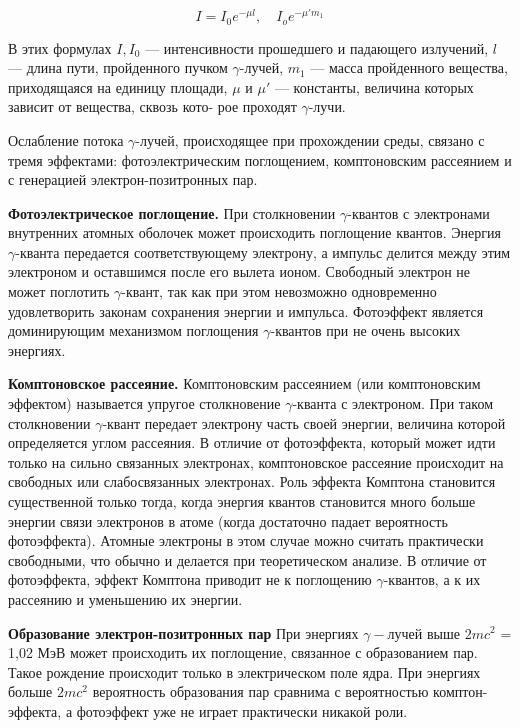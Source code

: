\documentclass[a4paper, 12pt]{article}%
\begin{document}
	\begin{equation}\label{I(mu)}
		I = I_0 e^{-\mu l}, \quad I_o e^{-\mu 'm_1} 
	\end{equation}
	
	В этих формулах $ I, I_0 $ --- интенсивности прошедшего и падающего излучений, $ l $ --- длина пути, пройденного пучком $\gamma$-лучей, $ m_1 $ ---
	масса пройденного вещества, приходящаяся на единицу площади, $ \mu $ и
	$ \mu' $ --- константы, величина которых зависит от вещества, сквозь кото-
	рое проходят $\gamma$-лучи. 
	
	Ослабление потока $\gamma$-лучей, происходящее при прохождении среды, связано с тремя эффектами: фотоэлектрическим поглощением,
	комптоновским рассеянием и с генерацией электрон-позитронных пар.
	
	\textbf{Фотоэлектрическое поглощение.} При столкновении $\gamma$-квантов с
	электронами внутренних атомных оболочек может происходить поглощение квантов. Энергия $\gamma$-кванта передается соответствующему электрону, а импульс делится между этим электроном и оставшимся после
	его вылета ионом. Свободный электрон не может поглотить $\gamma$-квант,
	так как при этом невозможно одновременно удовлетворить законам
	сохранения энергии и импульса. Фотоэффект является доминирующим механизмом поглощения $\gamma$-квантов при не очень высоких энергиях.
	
	\textbf{Комптоновское рассеяние.} Комптоновским рассеянием (или комптоновским эффектом) называется упругое столкновение $\gamma$-кванта с электроном. При таком столкновении $\gamma$-квант передает электрону часть своей энергии, величина которой определяется углом рассеяния. В отличие от фотоэффекта, который может идти только на сильно связанных электронах, комптоновское рассеяние происходит на свободных или слабосвязанных электронах. Роль эффекта Комптона становится
	существенной только тогда, когда энергия квантов становится много
	больше энергии связи электронов в атоме (когда достаточно падает
	вероятность фотоэффекта). Атомные электроны в этом случае можно
	считать практически свободными, что обычно и делается при теоретическом анализе.
	В отличие от фотоэффекта, эффект
	Комптона приводит не к поглощению $\gamma$-квантов, а к их рассеянию и
	уменьшению их энергии.
	
	\textbf{Образование электрон-позитронных пар} При энергиях $\gamma-$лучей выше $2mc^2$ = 1,02 МэВ может происходить их поглощение, связанное с образованием пар. Такое рождение происходит только в электрическом поле ядра. При энергиях больше  $2mc^2$ вероятность образования пар сравнима с вероятностью комптон-эффекта, а фотоэффект уже не играет практически никакой роли.
	
\end{document}
